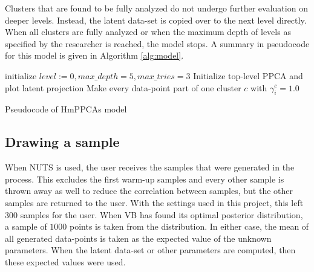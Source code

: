 Clusters that are found to be fully analyzed do not undergo further evaluation on deeper levels. Instead, the latent data-set is copied over to the next level directly. When all clusters are fully analyzed or when the maximum depth of levels as specified by the researcher is reached, the model stops. A summary in pseudocode for this model is given in Algorithm \ref{alg:model}.


\begin{algorithm}[H]
initialize $level := 0, max\_depth = 5, max\_tries = 3$\;
 Initialize top-level PPCA and plot latent projection\;
 Make every data-point part of one cluster $c$ with $\gamma^c_i=1.0$\;
 \caption{Pseudocode of HmPPCAs model}
 \label{alg:model}
\end{algorithm}



\subsection{Drawing a sample}
 When NUTS is used, the user receives the samples that were generated in the process. This excludes the first warm-up samples and every other sample is thrown away as well to reduce the correlation between samples, but the other samples are returned to the user. With the settings used in this project, this left $300$ samples for the user. When VB has found its optimal posterior distribution, a sample of $1000$ points is taken from the distribution. In either case, the mean of all generated data-points is taken as the expected value of the unknown parameters. When the latent data-set or other parameters are computed, then these expected values were used.

